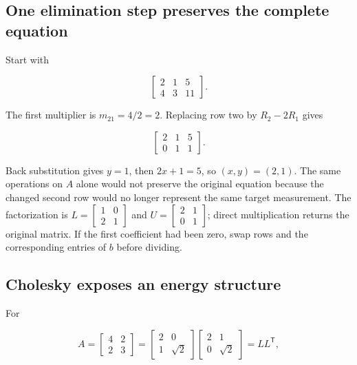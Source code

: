 \subsection{One elimination step preserves the complete equation}\label{02-foundations-ii-ch038-one-elimination-step-preserves-the-complete-equation}

Start with

\[
\left[\begin{array}{cc|c}2&1&5\\4&3&11\end{array}\right].
\]

The first multiplier is \(m_{21}=4/2=2\). Replacing row two by \(R_2-2R_1\) gives

\[
\left[\begin{array}{cc|c}2&1&5\\0&1&1\end{array}\right].
\]

Back substitution gives \(y=1\), then \(2x+1=5\), so \((x,y)=(2,1)\). The same operations on \(A\) alone would not preserve the original equation because the changed second row would no longer represent the same target measurement. The factorization is \(L=\begin{bmatrix}1&0\\2&1\end{bmatrix}\) and \(U=\begin{bmatrix}2&1\\0&1\end{bmatrix}\); direct multiplication returns the original matrix. If the first coefficient had been zero, swap rows and the corresponding entries of \(b\) before dividing.

\subsection{Cholesky exposes an energy structure}\label{02-foundations-ii-ch038-cholesky-exposes-an-energy-structure}

For

\[
A=\begin{bmatrix}4&2\\2&3\end{bmatrix}
=\begin{bmatrix}2&0\\1&\sqrt2\end{bmatrix}
\begin{bmatrix}2&1\\0&\sqrt2\end{bmatrix}=LL^\mathsf T,
\]

